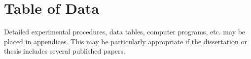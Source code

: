 \chapter{\quad Table of Data}
\label{appendixA}

Detailed experimental procedures, data tables, computer programs, etc. may be placed in appendices. This may be particularly appropriate if the dissertation or thesis includes several published papers.
